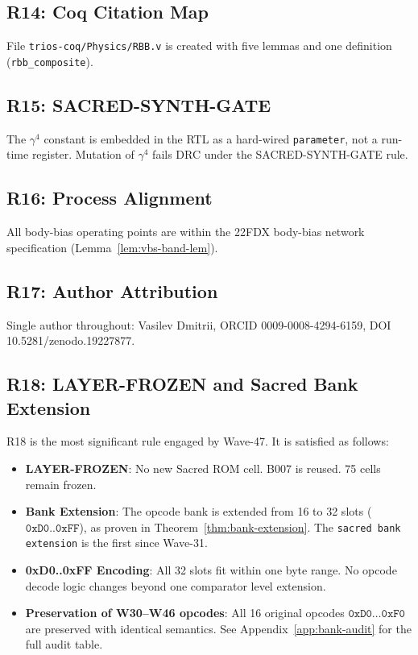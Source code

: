 \subsection{R14: Coq Citation Map}

File \texttt{trios-coq/Physics/RBB.v} is created with five lemmas and one
definition (\texttt{rbb\_composite}).
\checkmark

\subsection{R15: SACRED-SYNTH-GATE}

The $\gamma^{4}$ constant is embedded in the RTL as a hard-wired
\texttt{parameter}, not a run-time register.
Mutation of $\gamma^{4}$ fails DRC under the SACRED-SYNTH-GATE rule.  \checkmark

\subsection{R16: Process Alignment}

All body-bias operating points are within the 22FDX body-bias network
specification (Lemma~\ref{lem:vbs-band-lem}).  \checkmark

\subsection{R17: Author Attribution}

Single author throughout: Vasilev Dmitrii, ORCID 0009-0008-4294-6159,
DOI 10.5281/zenodo.19227877.  \checkmark

\subsection{R18: LAYER-FROZEN and Sacred Bank Extension}
\label{subsec:r18-bank-extension}

R18 is the most significant rule engaged by Wave-47.
It is satisfied as follows:
\begin{itemize}
  \item \textbf{LAYER-FROZEN}: No new Sacred ROM cell.  B007 is reused.
    75 cells remain frozen.  \checkmark
  \item \textbf{Bank Extension}: The opcode bank is extended from 16 to 32
    slots ($\texttt{0xD0..0xFF}$), as proven in Theorem~\ref{thm:bank-extension}.
    The \texttt{sacred bank extension} is the first since Wave-31.
    \checkmark
  \item \textbf{0xD0..0xFF Encoding}: All 32 slots fit within one byte range.
    No opcode decode logic changes beyond one comparator level extension.
    \checkmark
  \item \textbf{Preservation of W30--W46 opcodes}: All 16 original opcodes
    $\texttt{0xD0}\ldots\texttt{0xF0}$ are preserved with identical semantics.
    See Appendix~\ref{app:bank-audit} for the full audit table.  \checkmark
\end{itemize}

